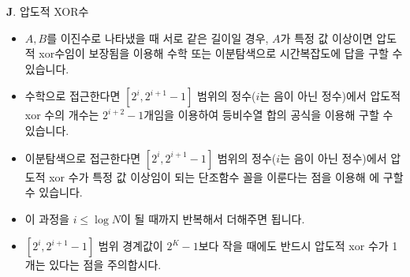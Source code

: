 \begin{frame}{\textbf{J}. 압도적 XOR수}
	\begin{itemize}
		\item $A, B$를 이진수로 나타냈을 때 서로 같은 길이일 경우, $A$가 특정 값 이상이면 압도적 xor수임이 보장됨을 이용해 수학 또는 이분탐색으로  시간복잡도에 답을 구할 수 있습니다.
		\item 수학으로 접근한다면 $[2^i, 2^{i+1}-1]$ 범위의 정수($i$는 음이 아닌 정수)에서 압도적 xor 수의 개수는 $2^{i+2}-1$개임을 이용하여 등비수열 합의 공식을 이용해 구할 수 있습니다.
		\item 이분탐색으로 접근한다면 $[2^i, 2^{i+1}-1]$ 범위의 정수($i$는 음이 아닌 정수)에서 압도적 xor 수가 특정 값 이상임이 되는 단조함수 꼴을 이룬다는 점을 이용해 에 구할 수 있습니다. 
		\item 이 과정을 $i \le \log N$이 될 때까지 반복해서 더해주면 됩니다.
		\item $[2^i, 2^{i+1}-1]$ 범위 경계값이 $2^K - 1$보다 작을 때에도 반드시 압도적 xor 수가 1개는 있다는 점을 주의합시다.
	\end{itemize}
\end{frame}